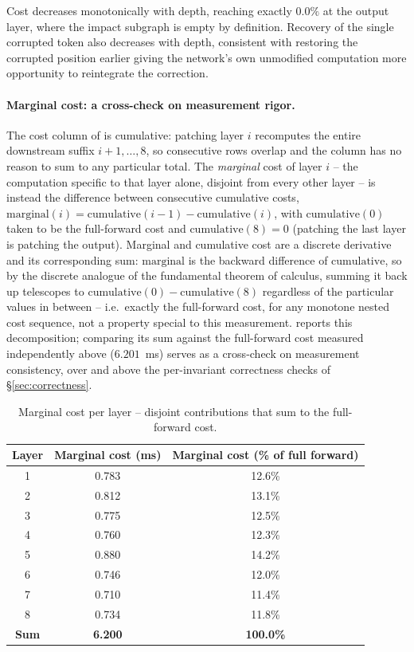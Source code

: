 \documentclass{article}
\begin{document}
Cost decreases monotonically with depth, reaching exactly $0.0\%$ at the output layer, where the
impact subgraph is empty by definition. Recovery of the single corrupted token also decreases
with depth, consistent with restoring the corrupted position earlier giving the network's own
unmodified computation more opportunity to reintegrate the correction.

\paragraph{Marginal cost: a cross-check on measurement rigor.} The cost column of
 is cumulative: patching layer $i$ recomputes the entire downstream suffix
$i{+}1, \ldots, 8$, so consecutive rows overlap and the column has no reason to sum to any
particular total. The \emph{marginal} cost of layer $i$ -- the computation specific to that layer
alone, disjoint from every other layer -- is instead the difference between consecutive cumulative
costs, $\text{marginal}(i) = \text{cumulative}(i{-}1) - \text{cumulative}(i)$, with
$\text{cumulative}(0)$ taken to be the full-forward cost and $\text{cumulative}(8) = 0$ (patching
the last layer is patching the output). Marginal and cumulative cost are a discrete derivative and
its corresponding sum: $\text{marginal}$ is the backward difference of $\text{cumulative}$, so by
the discrete analogue of the fundamental theorem of calculus, summing it back up telescopes to
$\text{cumulative}(0) - \text{cumulative}(8)$ regardless of the particular values in between --
i.e.\ exactly the full-forward cost, for any monotone nested cost sequence, not a property special
to this measurement.  reports this decomposition; comparing its sum against the
full-forward cost measured independently above ($6.201$~ms) serves as a cross-check on measurement
consistency, over and above the per-invariant correctness checks of \S\ref{sec:correctness}.

\begin{table}[H]
\centering
\caption{Marginal cost per layer -- disjoint contributions that sum to the full-forward cost.}
\label{tab:marginal}
\begin{tabular}{c c c}
\toprule
\textbf{Layer} & \textbf{Marginal cost (ms)} & \textbf{Marginal cost (\% of full forward)} \\
\midrule
1 & 0.783 & 12.6\% \\
2 & 0.812 & 13.1\% \\
\rowcolor{rowgray}
3 & 0.775 & 12.5\% \\
4 & 0.760 & 12.3\% \\
5 & 0.880 & 14.2\% \\
\rowcolor{rowgray}
6 & 0.746 & 12.0\% \\
7 & 0.710 & 11.4\% \\
8 & 0.734 & 11.8\% \\
\midrule
\textbf{Sum} & \textbf{6.200} & \textbf{100.0\%} \\
\bottomrule
\end{tabular}
\end{table}
\end{document}
